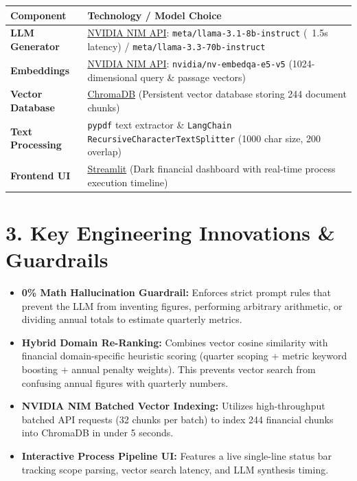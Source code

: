 \documentclass[11pt,a4paper]{article}
\begin{document}
\begin{table}[h]
\centering
\small
\begin{tabularx}{\textwidth}{l X}
\toprule
\textbf{Component} & \textbf{Technology / Model Choice} \\
\midrule
\textbf{LLM Generator} & \href{https://build.nvidia.com/}{NVIDIA NIM API}: \texttt{meta/llama-3.1-8b-instruct} (~1.5s latency) / \texttt{meta/llama-3.3-70b-instruct} \\
\textbf{Embeddings} & \href{https://build.nvidia.com/}{NVIDIA NIM API}: \texttt{nvidia/nv-embedqa-e5-v5} (1024-dimensional query \& passage vectors) \\
\textbf{Vector Database} & \href{https://www.trychroma.com/}{ChromaDB} (Persistent vector database storing 244 document chunks) \\
\textbf{Text Processing} & \texttt{pypdf} text extractor \& \texttt{LangChain RecursiveCharacterTextSplitter} (1000 char size, 200 overlap) \\
\textbf{Frontend UI} & \href{https://streamlit.io/}{Streamlit} (Dark financial dashboard with real-time process execution timeline) \\
\bottomrule
\end{tabularx}
\end{table}

\vspace{0.8em}

\section{3. Key Engineering Innovations \& Guardrails}

\begin{itemize}[leftmargin=1.5em]
    \item \textbf{0\% Math Hallucination Guardrail:} Enforces strict prompt rules that prevent the LLM from inventing figures, performing arbitrary arithmetic, or dividing annual totals to estimate quarterly metrics.
    \item \textbf{Hybrid Domain Re-Ranking:} Combines vector cosine similarity with financial domain-specific heuristic scoring (quarter scoping + metric keyword boosting + annual penalty weights). This prevents vector search from confusing annual figures with quarterly numbers.
    \item \textbf{NVIDIA NIM Batched Vector Indexing:} Utilizes high-throughput batched API requests (32 chunks per batch) to index 244 financial chunks into ChromaDB in under 5 seconds.
    \item \textbf{Interactive Process Pipeline UI:} Features a live single-line status bar tracking scope parsing, vector search latency, and LLM synthesis timing.
\end{itemize}
\end{document}
